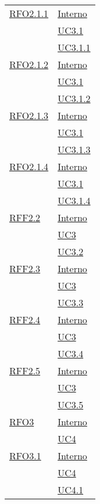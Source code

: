 \begin{longtable}{|>{\centering}m{5cm}|m{5cm}<{\centering}|}
\hyperlink{RFO2.1.1}{RFO2.1.1} & \hyperlink{Interno}{Interno}\\
& \hyperref[UC3.1]{UC3.1}\\
& \hyperref[UC3.1.1]{UC3.1.1}\\ \hline

\hyperlink{RFO2.1.2}{RFO2.1.2} & \hyperlink{Interno}{Interno}\\
& \hyperref[UC3.1]{UC3.1}\\
& \hyperref[UC3.1.2]{UC3.1.2}\\ \hline

\hyperlink{RFO2.1.3}{RFO2.1.3} & \hyperlink{Interno}{Interno}\\
& \hyperref[UC3.1]{UC3.1}\\
& \hyperref[UC3.1.3]{UC3.1.3}\\ \hline

\hyperlink{RFO2.1.4}{RFO2.1.4} & \hyperlink{Interno}{Interno}\\
& \hyperref[UC3.1]{UC3.1}\\
& \hyperref[UC3.1.4]{UC3.1.4}\\ \hline

\hyperlink{RFF2.2}{RFF2.2} & \hyperlink{Interno}{Interno}\\
& \hyperref[UC3]{UC3}\\
& \hyperref[UC3.2]{UC3.2}\\ \hline

\hyperlink{RFF2.3}{RFF2.3} & \hyperlink{Interno}{Interno}\\
& \hyperref[UC3]{UC3}\\
& \hyperref[UC3.3]{UC3.3}\\ \hline

\hyperlink{RFF2.4}{RFF2.4} & \hyperlink{Interno}{Interno}\\
& \hyperref[UC3]{UC3}\\
& \hyperref[UC3.4]{UC3.4}\\ \hline

\hyperlink{RFF2.5}{RFF2.5} & \hyperlink{Interno}{Interno}\\
& \hyperref[UC3]{UC3}\\
& \hyperref[UC3.5]{UC3.5}\\ \hline

\hyperlink{RFO3}{RFO3} & \hyperlink{Interno}{Interno}\\
& \hyperref[UC4]{UC4}\\ \hline

\hyperlink{RFO3.1}{RFO3.1} & \hyperlink{Interno}{Interno}\\
& \hyperref[UC4]{UC4}\\
& \hyperref[UC4.1]{UC4.1}\\ \hline


\end{longtable}
